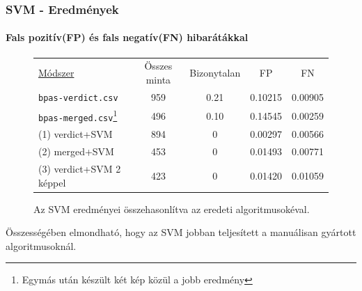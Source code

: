 \documentclass[11pt]{beamer}
\begin{document}
\begin{frame}
	\frametitle{SVM - Eredmények}
	\framesubtitle{Fals pozitív(FP) és fals negatív(FN) hibarátákkal}
	
	\begin{figure}[h!]
		\centering
		\begin{tabular}{ l c c c c }
			\underline{Módszer} 		& Összes minta 	& Bizonytalan	& FP	& FN \\
			\texttt{bpas-verdict.csv} 	& 959 			& 0.21			& 0.10215 	& 0.00905 	\\
			\texttt{bpas-merged.csv}\footnote{Egymás után készült két kép közül a jobb eredmény} 	& 496			& 0.10			& 0.14545 	& 0.00259   \\
			
			\hline
			(1) verdict+SVM					& 894			& 0				& 0.00297	& 0.00566	\\
			(2) merged+SVM					& 453			& 0				& 0.01493	& 0.00771	\\
			(3) verdict+SVM 2 képpel		& 423			& 0				& 0.01420	& 0.01059   \\
			
		\end{tabular}
		
		\caption{Az SVM eredményei összehasonlítva az eredeti algoritmusokéval.}
		
	\end{figure}

	Összességében elmondható, hogy az SVM jobban teljesített a manuálisan gyártott algoritmusoknál.
	
\end{frame}
\end{document}
